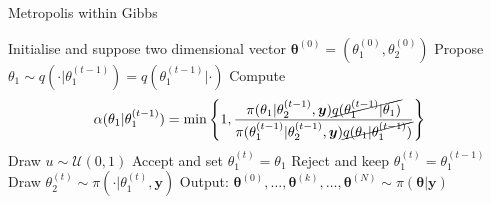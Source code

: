 \begin{algorithm}[!ht]
	\caption{Metropolis within Gibbs}
	\begin{algorithmic}[1]
		\STATE Initialise and suppose two dimensional vector \( \bm{\theta}^{(0)}  =( \theta_1^{(0)} , \theta_2^{(0)}  ) \)
		\STATE Propose \( \theta_1 \sim q(\cdot   | \theta_1 ^{(t-1)}) = q(\theta_1 ^{(t-1)} |\cdot  ) \)
		\STATE Compute
		\[ \alpha( \theta_1  | \theta_1^{(t-1)}) = \min \left\{ 1, \frac{\pi(\theta_1  | \theta^{(t-1)}_2, \bm{y}) \cancel{q(\theta_1^{(t-1)} | \theta_1 ) } }{\pi(\theta_1^{(t-1)}| \theta_2^{(t-1)}, \bm{y}) \cancel{q(\theta_1 | \theta_1^{(t-1)})} } \right\} \]
		\STATE Draw $u \sim \mathcal{U}(0,1)$
		\STATE Accept and set \( \theta_1^{(t)} = \theta_1 \)
		\ELSE  
		\STATE Reject and keep \(\theta_1^{(t)} = \theta_1^{(t-1)} \)
		\ENDIF
		\STATE Draw \(\theta_2^{(t)} \sim  \pi( \cdot | \theta_1^{(t)} , \bm{y} )\) 
		\ENDFOR
		\STATE Output: $ \bm{\theta}^{(0)}, \dots,  \bm{\theta}^{(k)} , \dots,   \bm{\theta}^{(N)} \sim \pi(\bm{\theta}| \bm{y}) $
	\end{algorithmic}
	\label{alg:MwG}
\end{algorithm}


